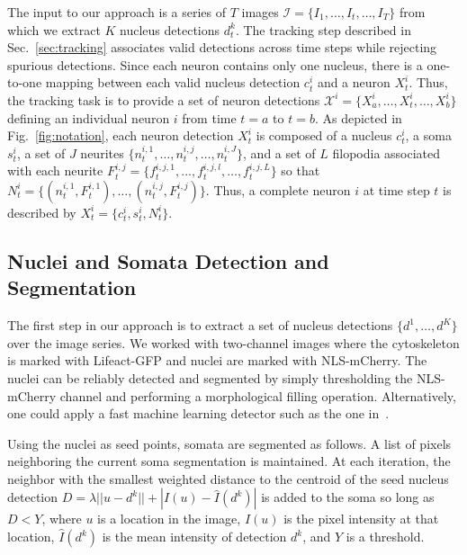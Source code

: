 
\vspace{-3mm}

The input to our approach is a series of $T$
images $\mathcal{I} = \{I_1, \ldots, I_t, \ldots,
I_T\}$ from which we extract $K$ nucleus
detections $d_t^k$.  The tracking step described
in Sec.~\ref{sec:tracking} associates valid
detections across time steps while rejecting
spurious detections. Since each neuron contains
only one nucleus, there is a one-to-one mapping
between each valid nucleus detection $c_t^i$ and a
neuron $X_t^i$.  Thus, the tracking task is to
provide a set of neuron detections $\mathcal{X}^i
= \{X_{a}^i,\ldots,X_t^i,\ldots,X_{b}^i \}$
defining an individual neuron $i$ from time $t=a$
to $t=b$.  As depicted in Fig.~\ref{fig:notation},
each neuron detection $X_t^i$ is composed of a
nucleus $c_t^i$, a soma $s_t^i$, a set of $J$
neurites $\{n_t^{i,1}, \ldots, n_t^{i,j}, \ldots,
n_t^{i,J} \}$, and a set of $L$ filopodia
associated with each neurite $F_t^{i,j} =
\{f_t^{i,j,1},\ldots,f_t^{i,j,l},\ldots,f_t^{i,j,L}
\}$ so that $N_t^i = \{( n_t^{i,1},F_t^{i,1}),
\ldots,(n_t^{i,j},F_t^{i,j}) \}$.  Thus, a
complete neuron $i$ at time step $t$ is described
by $X_t^i = \{ c_t^i, s_t^i, N_t^i \}$.


\vspace{-3mm}
\subsection{Nuclei and Somata Detection and Segmentation}
\vspace{-2mm}
\label{sec:detection}
The first step in our approach is to extract a set
of nucleus detections $\{d^1,\ldots,d^K\}$ over
the image series. We worked with two-channel
images where the cytoskeleton is marked with
Lifeact-GFP and nuclei are marked with
NLS-mCherry. The nuclei can be reliably detected
and segmented by simply thresholding the
NLS-mCherry channel and performing a morphological
filling operation.  Alternatively, one could apply
a fast machine learning detector such as the one
in~\cite{Smith09}.


Using the nuclei as seed points, somata are
segmented as follows.  A list of pixels
neighboring the current soma segmentation is
maintained.  At each iteration, the neighbor with
the smallest weighted distance to the centroid of
the seed nucleus detection $D = \lambda || u -
d^k|| + |I(u) - \hat{I}(d^k)|$ is added to the
soma so long as $D < Y$, where $u$ is a location
in the image, $I(u)$ is the pixel intensity at
that location, $\hat{I}(d^k)$ is the mean
intensity of detection $d^k$, and $Y$ is a
threshold.


